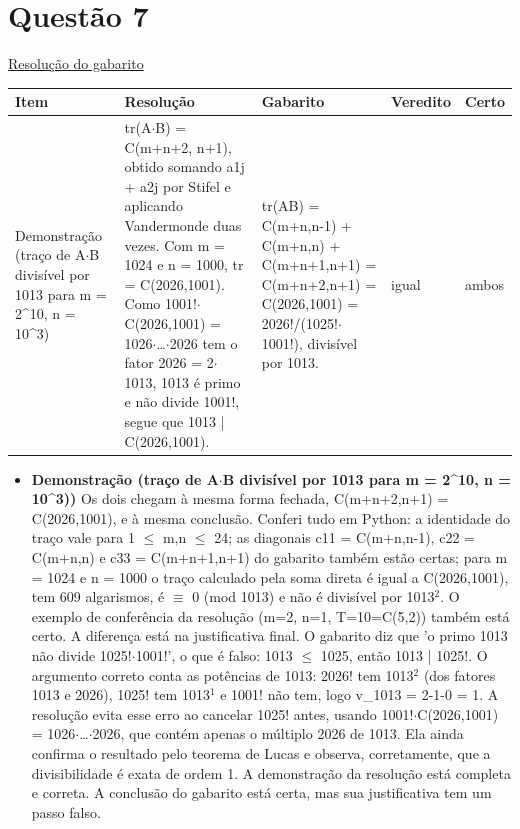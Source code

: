 \documentclass{article}%
\begin{document}
\section*{Questão 7}%
\href{https://poliedroresolve.sistemapoliedro.com.br/vestibulares/ime/2027/ime-2-fase-dia-1-26-10-2026-2-fase-dia-1/dissertativa-7-matematica-2-fase-dia-1-ime-2027}{Resolução do gabarito}\par\smallskip%
\begin{longtable}{@{}p{} p{} p{} p{} p{}@{}}\toprule Item & Resolução & Gabarito & Veredito & Certo \\ \midrule
Demonstração (traço de A$\cdot$B divisível por 1013 para m = 2\^{}10, n = 10\^{}3) & tr(A$\cdot$B) = C(m+n+2, n+1), obtido somando a1j + a2j por Stifel e aplicando Vandermonde duas vezes. Com m = 1024 e n = 1000, tr = C(2026,1001). Como 1001!$\cdot$C(2026,1001) = 1026$\cdot$\ldots{}$\cdot$2026 tem o fator 2026 = 2$\cdot$1013, 1013 é primo e não divide 1001!, segue que 1013 | C(2026,1001). & tr(AB) = C(m+n,n-1) + C(m+n,n) + C(m+n+1,n+1) = C(m+n+2,n+1) = C(2026,1001) = 2026!/(1025!$\cdot$1001!), divisível por 1013. & igual & ambos \\
\bottomrule\end{longtable}%
\begin{itemize}%
\item%
\textbf{Demonstração (traço de A$\cdot$B divisível por 1013 para m = 2\^{}10, n = 10\^{}3))} Os dois chegam à mesma forma fechada, C(m+n+2,n+1) = C(2026,1001), e à mesma conclusão. Conferi tudo em Python: a identidade do traço vale para 1 $\leq$ m,n $\leq$ 24; as diagonais c11 = C(m+n,n-1), c22 = C(m+n,n) e c33 = C(m+n+1,n+1) do gabarito também estão certas; para m = 1024 e n = 1000 o traço calculado pela soma direta é igual a C(2026,1001), tem 609 algarismos, é $\equiv$ 0 (mod 1013) e não é divisível por 1013$^2$. O exemplo de conferência da resolução (m=2, n=1, T=10=C(5,2)) também está certo. A diferença está na justificativa final. O gabarito diz que 'o primo 1013 não divide 1025!$\cdot$1001!', o que é falso: 1013 $\leq$ 1025, então 1013 | 1025!. O argumento correto conta as potências de 1013: 2026! tem 1013$^2$ (dos fatores 1013 e 2026), 1025! tem 1013$^{1}$ e 1001! não tem, logo v\_1013 = 2-1-0 = 1. A resolução evita esse erro ao cancelar 1025! antes, usando 1001!$\cdot$C(2026,1001) = 1026$\cdot$\ldots{}$\cdot$2026, que contém apenas o múltiplo 2026 de 1013. Ela ainda confirma o resultado pelo teorema de Lucas e observa, corretamente, que a divisibilidade é exata de ordem 1. A demonstração da resolução está completa e correta. A conclusão do gabarito está certa, mas sua justificativa tem um passo falso.%
\end{itemize}%
\end{document}
